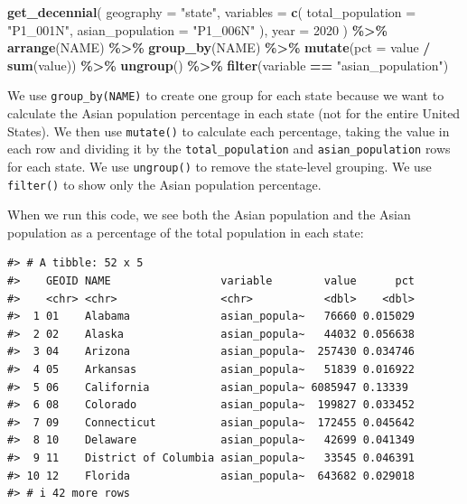 \documentclass[
]{book}
\newenvironment{Shaded}{\begin{snugshade}}{\end{snugshade}}
\newcommand{\AttributeTok}[1]{\textcolor[rgb]{0.13,0.29,0.53}{#1}}
\newcommand{\DecValTok}[1]{\textcolor[rgb]{0.00,0.00,0.81}{#1}}
\newcommand{\FunctionTok}[1]{\textcolor[rgb]{0.13,0.29,0.53}{\textbf{#1}}}
\newcommand{\NormalTok}[1]{#1}
\newcommand{\SpecialCharTok}[1]{\textcolor[rgb]{0.81,0.36,0.00}{\textbf{#1}}}
\newcommand{\StringTok}[1]{\textcolor[rgb]{0.31,0.60,0.02}{#1}}
\begin{document}
\begin{Shaded}
\begin{Highlighting}[]
\FunctionTok{get\_decennial}\NormalTok{(}
  \AttributeTok{geography =} \StringTok{"state"}\NormalTok{,}
  \AttributeTok{variables =} \FunctionTok{c}\NormalTok{(}
    \AttributeTok{total\_population =} \StringTok{"P1\_001N"}\NormalTok{,}
    \AttributeTok{asian\_population =} \StringTok{"P1\_006N"}
\NormalTok{  ),}
  \AttributeTok{year =} \DecValTok{2020}
\NormalTok{) }\SpecialCharTok{\%\textgreater{}\%}
  \FunctionTok{arrange}\NormalTok{(NAME) }\SpecialCharTok{\%\textgreater{}\%}
  \FunctionTok{group\_by}\NormalTok{(NAME) }\SpecialCharTok{\%\textgreater{}\%}
  \FunctionTok{mutate}\NormalTok{(}\AttributeTok{pct =}\NormalTok{ value }\SpecialCharTok{/} \FunctionTok{sum}\NormalTok{(value)) }\SpecialCharTok{\%\textgreater{}\%}
  \FunctionTok{ungroup}\NormalTok{() }\SpecialCharTok{\%\textgreater{}\%}
  \FunctionTok{filter}\NormalTok{(variable }\SpecialCharTok{==} \StringTok{"asian\_population"}\NormalTok{)}
\end{Highlighting}
\end{Shaded}

We use \texttt{group\_by(NAME)} to create one group for each state because we want to calculate the Asian population percentage in each state (not for the entire United States). We then use \texttt{mutate()} to calculate each percentage, taking the value in each row and dividing it by the \texttt{total\_population} and \texttt{asian\_population} rows for each state. We use \texttt{ungroup()} to remove the state-level grouping. We use \texttt{filter()} to show only the Asian population percentage.

When we run this code, we see both the Asian population and the Asian population as a percentage of the total population in each state:

\begin{verbatim}
#> # A tibble: 52 x 5
#>    GEOID NAME                 variable        value      pct
#>    <chr> <chr>                <chr>           <dbl>    <dbl>
#>  1 01    Alabama              asian_popula~   76660 0.015029
#>  2 02    Alaska               asian_popula~   44032 0.056638
#>  3 04    Arizona              asian_popula~  257430 0.034746
#>  4 05    Arkansas             asian_popula~   51839 0.016922
#>  5 06    California           asian_popula~ 6085947 0.13339 
#>  6 08    Colorado             asian_popula~  199827 0.033452
#>  7 09    Connecticut          asian_popula~  172455 0.045642
#>  8 10    Delaware             asian_popula~   42699 0.041349
#>  9 11    District of Columbia asian_popula~   33545 0.046391
#> 10 12    Florida              asian_popula~  643682 0.029018
#> # i 42 more rows
\end{verbatim}
\end{document}
